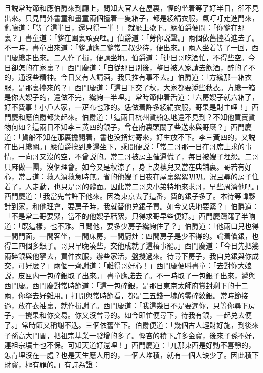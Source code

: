且説常時節和應伯爵來到廳上，問知大官人在屋裏，懽的坐着等了好半日，卻不見出來。只見門外書童和畫童兩個擡着一隻箱子，都是綾絹衣服，氣吁吁走進門來，亂嚷道：「等了這半日，還只得一半！」就廳上歇下。應伯爵便問：「你爹在那裏？」書童道：「爹在園裏頑耍哩。」伯爵道：「勞你説聲。」兩個依舊擡着進去了。不一時，書童出來道：「爹請應二爹常二叔少待，便出來。」兩人坐着等了一回，西門慶纔走出來。二人作了揖，便請坐地。伯爵道：「連日哥吃酒忙，不得些空。今日卻怎的在家裏？」西門慶道：「自従那日別後，整日被人家請去飲酒，醉的了不的，通沒些精神。今日又有人請酒，我只推有事不去。」伯爵道：「方纔那一箱衣服，是那裏擡來的？」西門慶道：「這目下交了秋，大家都要添些秋衣。方纔一箱是你大嫂子的，還做不完，纔夠一半哩。」常時節伸着舌道：「六房嫂子就六箱了，好不費事！小戶人家，一疋布也難的。恁做着許多綾絹衣服，哥果是財主哩！」西門慶和應伯爵都笑起來。伯爵道：「這兩日杭州貨船怎地還不見到？不知他買賣貨物何如？這兩日不知李三黄四的銀子，曾在府裏頭關了些送來與哥麽？」西門慶道：「貨船不知在那裏擔閣着，書也没捎封寄來，好生放不下。李三黃四的，又説在出月纔關。」應伯爵挨到身邊坐下，乘間便説：「常二哥那一日在哥席上求的事情，一向哥又沒的空，不曾説的。常二哥被房主催逼慌了，每日被嫂子埋怨。二哥只麻做一團，沒個理會。如今又是秋涼了，身上皮襖兒又當在典舖裏。哥若有好心，常言道：救人湏救急時無。省的他嫂子日夜在屋裏絮絮叨叨。況且尋的房子住着了，人走動，也只是哥的體面。因此常二哥央小弟特地來求哥，早些周濟他吧。」西門慶道：「我當先曾許下他來。因為東京去了這番，費的銀子多了。本待等韓夥計到家，和他理會，要房子時，我就替他兑銀子買。如今又恁地要緊？」伯爵道：「不是常二哥要緊，當不的他嫂子聒絮，只得求哥早些便好。」西門慶躊躇了半晌道：「既這樣，也不難。且問他，要多少房子纔夠住了？」伯爵道：「他兩口兒也得一間門面，一間客坐，一間床房，一間廚灶：四間房子是少不得的。論着價銀，也得三四個多銀子。哥只早晚凑些，交他成就了這樁事罷。」西門慶道：「今日先把幾兩碎銀與他拏去，買件衣服，辦些家活，盤攪過來。待尋下房子，我自兑銀與你成交，可好麽？」兩個一齊謝道：「難得哥好心！」西門慶便呌書童：「去對你大娘説，皮匣内一包碎銀取了出來。」書童應諾去了。不一時取了一包銀子出來，遞與西門慶。西門慶對常時節道：「這一包碎銀，是那日東京太師府賞封剩下的十二兩，你拏去好雜用。」打開與常時節看，都是三五錢一塊的零碎紋銀。常時節接過，放在衣袖裏，就作揖謝了。西門慶道：「我這幾日不是要遲你，只等你尋下房子，一攪果和你交易。你又沒曾尋的。如今即忙便尋下，待我有銀，一起兑去便了。」常時節又稱謝不迭。三個依舊坐下。伯爵便道：「幾個古人輕財好施，到後來子孫高大門閭，把祖宗基業一發增的多了。慳吝的積下許多金寶，後來子孫不好，連祖宗墳土也不保。可知天道好還哩！」西門慶道：「兀那東西是好動不喜靜的，怎肯埋沒在一處？也是天生應人用的，一個人堆積，就有一個人缺少了。因此積下財寳，極有罪的。」有詩為證：

